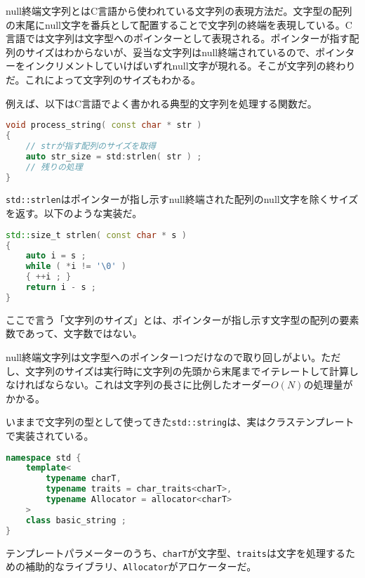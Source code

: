 null終端文字列とはC言語から使われている文字列の表現方法だ。文字型の配列の末尾にnull文字を番兵として配置することで文字列の終端を表現している。C言語では文字列は文字型へのポインターとして表現される。ポインターが指す配列のサイズはわからないが、妥当な文字列はnull終端されているので、ポインターをインクリメントしていけばいずれnull文字が現れる。そこが文字列の終わりだ。これによって文字列のサイズもわかる。

\ifTombow\pagebreak\fi
例えば、以下はC言語でよく書かれる典型的文字列を処理する関数だ。

\begin{lstlisting}[language={C++}]
void process_string( const char * str )
{
    // strが指す配列のサイズを取得
    auto str_size = std:strlen( str ) ;
    // 残りの処理
}
\end{lstlisting}

\texttt{std::strlen}はポインターが指し示すnull終端された配列のnull文字を除くサイズを返す。以下のような実装だ。

\begin{lstlisting}[language={C++}]
std::size_t strlen( const char * s )
{
    auto i = s ;
    while ( *i != '\0' )
    { ++i ; }
    return i - s ;
} 
\end{lstlisting}

ここで言う「文字列のサイズ」とは、ポインターが指し示す文字型の配列の要素数であって、文字数ではない。

null終端文字列は文字型へのポインター1つだけなので取り回しがよい。ただし、文字列のサイズは実行時に文字列の先頭から末尾までイテレートして計算しなければならない。これは文字列の長さに比例したオーダー\(O(N)\)の処理量がかかる。


いままで文字列の型として使ってきた\texttt{std::string}は、実はクラステンプレートで実装されている。

\begin{lstlisting}[language={C++}]
namespace std {
    template<
        typename charT,
        typename traits = char_traits<charT>,
        typename Allocator = allocator<charT>
    >
    class basic_string ;
}
\end{lstlisting}

テンプレートパラメーターのうち、\texttt{charT}が文字型、\texttt{traits}は文字を処理するための補助的なライブラリ、\texttt{Allocator}がアロケーターだ。

